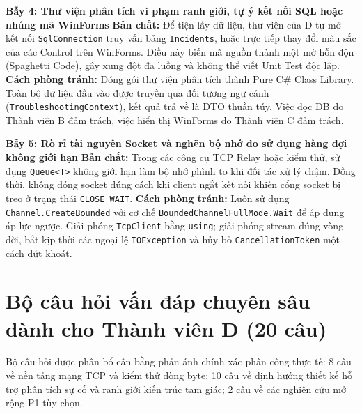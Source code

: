 \documentclass[12pt,a4paper]{article}
\begin{document}
\begin{pitfallbox}
\textbf{Bẫy 4: Thư viện phân tích vi phạm ranh giới, tự ý kết nối SQL hoặc nhúng mã WinForms}
\newline \textbf{Bản chất:} Để tiện lấy dữ liệu, thư viện của D tự mở kết nối \texttt{SqlConnection} truy vấn bảng \texttt{Incidents}, hoặc trực tiếp thay đổi màu sắc của các Control trên WinForms. Điều này biến mã nguồn thành một mớ hỗn độn (Spaghetti Code), gây xung đột đa luồng và không thể viết Unit Test độc lập.
\newline \textbf{Cách phòng tránh:} Đóng gói thư viện phân tích thành Pure C\# Class Library. Toàn bộ dữ liệu đầu vào được truyền qua đối tượng ngữ cảnh (\texttt{TroubleshootingContext}), kết quả trả về là DTO thuần túy. Việc đọc DB do Thành viên B đảm trách, việc hiển thị WinForms do Thành viên C đảm trách.
\end{pitfallbox}

\begin{pitfallbox}
\textbf{Bẫy 5: Rò rỉ tài nguyên Socket và nghẽn bộ nhớ do sử dụng hàng đợi không giới hạn}
\newline \textbf{Bản chất:} Trong các công cụ TCP Relay hoặc kiểm thử, sử dụng \texttt{Queue<T>} không giới hạn làm bộ nhớ phình to khi đối tác xử lý chậm. Đồng thời, không đóng socket đúng cách khi client ngắt kết nối khiến cổng socket bị treo ở trạng thái \texttt{CLOSE\_WAIT}.
\newline \textbf{Cách phòng tránh:} Luôn sử dụng \texttt{Channel.CreateBounded} với cơ chế \texttt{BoundedChannelFullMode.Wait} để áp dụng áp lực ngược. Giải phóng \texttt{TcpClient} bằng \texttt{using}; giải phóng stream đúng vòng đời, bắt kịp thời các ngoại lệ \texttt{IOException} và hủy bỏ \texttt{CancellationToken} một cách dứt khoát.
\end{pitfallbox}



\section{Bộ câu hỏi vấn đáp chuyên sâu dành cho Thành viên D (20 câu)}

\begin{summarybox}
Bộ câu hỏi được phân bổ cân bằng phản ánh chính xác phân công thực tế: 8 câu về nền tảng mạng TCP và kiểm thử dòng byte; 10 câu về định hướng thiết kế hỗ trợ phân tích sự cố và ranh giới kiến trúc tam giác; 2 câu về các nghiên cứu mở rộng P1 tùy chọn.
\end{summarybox}
\end{document}
